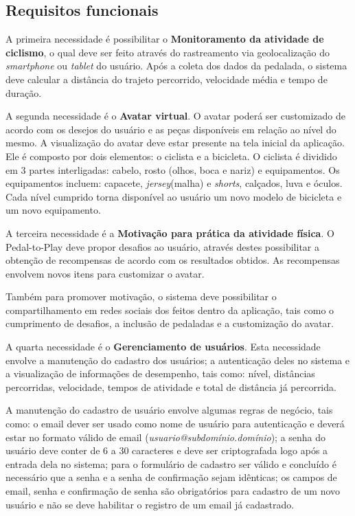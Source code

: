 \subsection{Requisitos funcionais}
A primeira necessidade é possibilitar o \textbf{Monitoramento da atividade de ciclismo}, o qual deve ser feito através do rastreamento via geolocalização do \textit{smartphone} ou \textit{tablet} do usuário. Após a coleta dos dados da pedalada, o sistema deve calcular a distância do trajeto percorrido, velocidade média e tempo de duração.
\par
A segunda necessidade é o \textbf{Avatar virtual}. O avatar poderá ser customizado de acordo com os desejos do usuário e as peças disponíveis em relação ao nível do mesmo. A visualização do avatar deve estar presente na tela inicial da aplicação.
Ele é composto por dois elementos: o ciclista e a bicicleta. O ciclista é dividido em 3 partes interligadas: cabelo, rosto (olhos, boca e nariz) e equipamentos. Os equipamentos incluem: capacete, \textit{jersey}(malha) e \textit{shorts}, calçados, luva e óculos. Cada nível cumprido torna disponível ao usuário um novo modelo de bicicleta e um novo equipamento. 
\par
A terceira necessidade é a \textbf{Motivação para prática da atividade física}. O Pedal-to-Play deve propor desafios ao usuário, através destes possibilitar a obtenção de recompensas de acordo com os resultados obtidos. As recompensas envolvem novos itens para customizar o avatar. 
\par 
Também para promover motivação, o sistema deve possibilitar o compartilhamento em redes sociais dos feitos dentro da aplicação, tais como o cumprimento de desafios, a inclusão de pedaladas e a customização do avatar. 
\par 
A quarta necessidade é o \textbf{Gerenciamento de usuários}. Esta necessidade envolve a manutenção do cadastro dos usuários; a autenticação deles no sistema e a visualização de informações de desempenho, tais como: nível, distâncias percorridas, velocidade, tempos de atividade e total de distância já percorrida.
\par
A manutenção do cadastro de usuário envolve algumas regras de negócio, tais como:
o email dever ser usado como nome de usuário para autenticação e deverá estar no formato válido de email (\textit{usuario@subdomínio.domínio}); a senha do usuário deve conter de 6 a 30 caracteres e deve ser criptografada logo após a entrada dela no sistema; para o formulário de cadastro ser válido e concluído é necessário que a senha e a senha de confirmação sejam idênticas; os campos de email, senha e confirmação de senha são obrigatórios para cadastro de um novo usuário e não se deve habilitar o registro de um email já cadastrado. 
    
